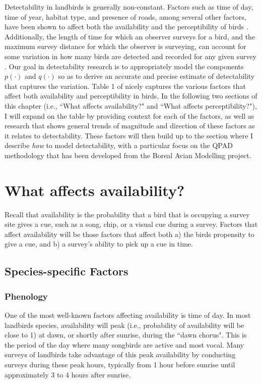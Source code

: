 \par Detectability in landbirds is generally non-constant. 
Factors such as time of day, time of year, habitat type, and presence of roads, among several other factors, have been shown to affect both the availability and the perceptibility of birds \citep{wilson_reliability_1985, solymos_calibrating_2013, johnston_species_2014, cooke_road_2020}. 
Additionally, the length of time for which an observer surveys for a bird, and the maximum survey distance for which the observer is surveying, can account for some variation in how many birds are detected and recorded for any given survey \citep{alldredge_factors_2007, solymos_calibrating_2013, buckland_distance_2015}.  
Our goal in detectability research is to appropriately model the components $p(\cdot)$ and $q(\cdot)$ so as to derive an accurate and precise estimate of detectability that captures the variation.
Table 1 of \citet{johnson_defense_2008} nicely captures the various factors that affect both availability and perceptibility in birds.
In the following two sections of this chapter (i.e., ``What affects availability?" and ``What affects perceptibility?"), I will expand on the table by providing context for each of the factors, as well as research that shows general trends of magnitude and direction of these factors as it relates to detectability.
These factors will then build up to the section where I describe \textit{how} to model detectability, with a particular focus on the QPAD methodology that has been developed from the Boreal Avian Modelling project.


\section{What affects availability?}

\par Recall that availability is the probability that a bird that is occupying a survey site gives a cue, such as a song, chip, or a visual cue during a survey.
Factors that affect availability will be those factors that affect both a) the birds propensity to give a cue, and b) a survey's ability to pick up a cue in time.

\subsection{Species-specific Factors}
\subsubsection{Phenology}
\par One of the most well-known factors affecting availability is time of day.
In most landbirds species, availability will peak (i.e., probability of availability will be close to 1) at dawn, or shortly after sunrise, during the ``dawn chorus".
This is the period of the day where many songbirds are active and most vocal.
Many surveys of landbirds take advantage of this peak availability by conducting surveys during these peak hours, typically from 1 hour before sunrise until approximately 3 to 4 hours after sunrise.

